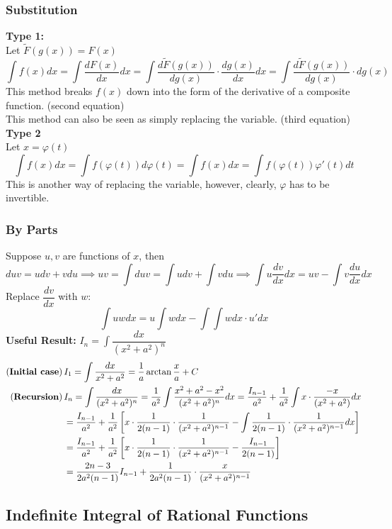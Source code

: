 \documentclass{article}
\newcommand{\0}{{\bf{0}}}
\begin{document}
\subsubsection{Substitution}
\textbf{Type 1:}\\
Let $\tilde{F}(g(x))=F(x)$
$$\int f(x)dx=\int\frac{dF(x)}{dx}dx=\int\frac{d\tilde{F}(g(x))}{dg(x)}\cdot\frac{dg(x)}{dx}dx=\int\frac{d\tilde{F}(g(x))}{dg(x)}\cdot dg(x)$$
This method breaks $f(x)$ down into the form of the derivative of a composite function. (second equation)\\
This method can also be seen as simply replacing the variable. (third equation)\\
\textbf{Type 2}\\
Let $x=\varphi(t)$
$$\int f(x)dx=\int f(\varphi(t))d\varphi(t)=\int f(x)dx=\int f(\varphi(t))\varphi'(t)dt$$
This is another way of replacing the variable, however, clearly, $\varphi$ has to be invertible.
\subsubsection{By Parts}
Suppose $u,v$ are functions of $x$, then
$$duv=udv+vdu\implies uv=\int duv=\int udv+\int vdu\implies\int u\frac{dv}{dx}dx=uv-\int v\frac{du}{dx}dx$$
Replace $\dfrac{dv}{dx}$ with $w$:
$$\int uwdx=u\int wdx-\int\int wdx\cdot u'dx$$
\textbf{Useful Result:} $I_n=\displaystyle\int\dfrac{dx}{(x^2+a^2)^n}$
\begin{equation}
\begin{split}
    (\mbox{\textbf{Initial case}})\,&I_1=\int\frac{dx}{x^2+a^2}=\frac{1}{a}\arctan\frac{x}{a}+C\\
    (\mbox{\textbf{Recursion}})\,&I_n=\int\dfrac{dx}{(x^2+a^2)^n}=\frac{1}{a^2}\int\frac{x^2+a^2-x^2}{(x^2+a^2)^n}dx=\frac{I_{n-1}}{a^2}+\frac{1}{a^2}\int x\cdot\frac{-x}{(x^2+a^2)}dx\\
    &=\frac{I_{n-1}}{a^2}+\frac{1}{a^2}\left[x\cdot\frac{1}{2(n-1)}\cdot\frac{1}{(x^2+a^2)^{n-1}}-\int\frac{1}{2(n-1)}\cdot\frac{1}{(x^2+a^2)^{n-1}}dx\right]\\
    &=\frac{I_{n-1}}{a^2}+\frac{1}{a^2}\left[x\cdot\frac{1}{2(n-1)}\cdot\frac{1}{(x^2+a^2)^{n-1}}-\frac{I_{n-1}}{2(n-1)}\right]\\
    &=\frac{2n-3}{2a^2(n-1)}I_{n-1}+\frac{1}{2a^2(n-1)}\cdot\frac{x}{(x^2+a^2)^{n-1}}
\end{split}
\end{equation}
\subsection{Indefinite Integral of Rational Functions}
\end{document}
